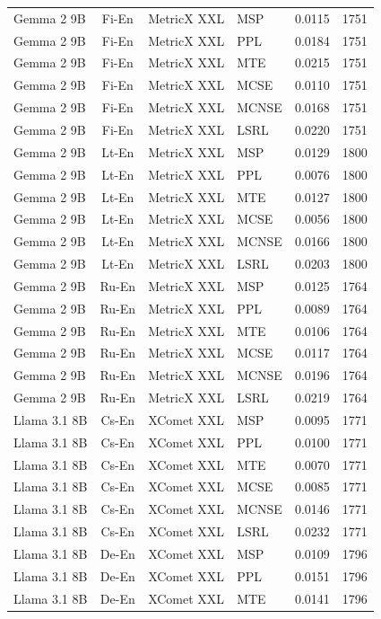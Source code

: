 \begin{table}
\begin{tabular}{lc}
Gemma 2 9B & Fi-En & MetricX XXL & MSP & 0.0115 & 1751 \\
Gemma 2 9B & Fi-En & MetricX XXL & PPL & 0.0184 & 1751 \\
Gemma 2 9B & Fi-En & MetricX XXL & MTE & 0.0215 & 1751 \\
Gemma 2 9B & Fi-En & MetricX XXL & MCSE & 0.0110 & 1751 \\
Gemma 2 9B & Fi-En & MetricX XXL & MCNSE & 0.0168 & 1751 \\
Gemma 2 9B & Fi-En & MetricX XXL & LSRL & 0.0220 & 1751 \\
Gemma 2 9B & Lt-En & MetricX XXL & MSP & 0.0129 & 1800 \\
Gemma 2 9B & Lt-En & MetricX XXL & PPL & 0.0076 & 1800 \\
Gemma 2 9B & Lt-En & MetricX XXL & MTE & 0.0127 & 1800 \\
Gemma 2 9B & Lt-En & MetricX XXL & MCSE & 0.0056 & 1800 \\
Gemma 2 9B & Lt-En & MetricX XXL & MCNSE & 0.0166 & 1800 \\
Gemma 2 9B & Lt-En & MetricX XXL & LSRL & 0.0203 & 1800 \\
Gemma 2 9B & Ru-En & MetricX XXL & MSP & 0.0125 & 1764 \\
Gemma 2 9B & Ru-En & MetricX XXL & PPL & 0.0089 & 1764 \\
Gemma 2 9B & Ru-En & MetricX XXL & MTE & 0.0106 & 1764 \\
Gemma 2 9B & Ru-En & MetricX XXL & MCSE & 0.0117 & 1764 \\
Gemma 2 9B & Ru-En & MetricX XXL & MCNSE & 0.0196 & 1764 \\
Gemma 2 9B & Ru-En & MetricX XXL & LSRL & 0.0219 & 1764 \\
Llama 3.1 8B & Cs-En & XComet XXL & MSP & 0.0095 & 1771 \\
Llama 3.1 8B & Cs-En & XComet XXL & PPL & 0.0100 & 1771 \\
Llama 3.1 8B & Cs-En & XComet XXL & MTE & 0.0070 & 1771 \\
Llama 3.1 8B & Cs-En & XComet XXL & MCSE & 0.0085 & 1771 \\
Llama 3.1 8B & Cs-En & XComet XXL & MCNSE & 0.0146 & 1771 \\
Llama 3.1 8B & Cs-En & XComet XXL & LSRL & 0.0232 & 1771 \\
Llama 3.1 8B & De-En & XComet XXL & MSP & 0.0109 & 1796 \\
Llama 3.1 8B & De-En & XComet XXL & PPL & 0.0151 & 1796 \\
Llama 3.1 8B & De-En & XComet XXL & MTE & 0.0141 & 1796 \\

\end{tabular}
\end{table}
